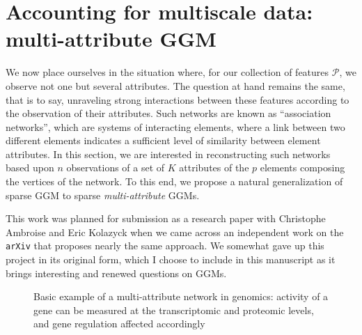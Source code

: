 \section{Accounting for multiscale data: multi-attribute GGM}
\label{sec:multiattribute_ggm}

We now place  ourselves in the situation where, for  our collection of
features $\mathcal{P}$, we observe not one but several attributes. The
question at hand  remains the same, that is to  say, unraveling strong
interactions between  these features  according to the  observation of
their   attributes.   Such   networks  are   known  as   ``association
networks'', which  are systems of  interacting elements, where  a link
between  two  different  elements  indicates  a  sufficient  level  of
similarity  between  element  attributes.   In this  section,  we  are
interested in reconstructing such networks based upon $n$ observations
of a set of $K$ attributes  of the $p$ elements composing the vertices
of the  network. To this end,  we propose a natural  generalization of
sparse GGM to sparse \emph{multi-attribute} GGMs.
\begin{remark}
  This  work was  planned for  submission as  a  research paper  with
  Christophe  Ambroise  and  Eric  Kolazyck when  we  came  across  an
  independent  work \cite{kolar2014graph}  on the  \texttt{arXiv} that
  proposes nearly the same approach.  We somewhat gave up this project
  in its original  form, which I choose to include  in this manuscript
  as it brings interesting and renewed questions on GGMs.
\end{remark}

\begin{figure}[htbp!]
  \centering
  \caption{Basic example of a multi-attribute network in genomics:
    activity  of a  gene  can  be measured  at  the transcriptomic  and
    proteomic levels, and gene regulation affected accordingly}
\label{fig:central_dogma}
\end{figure}

